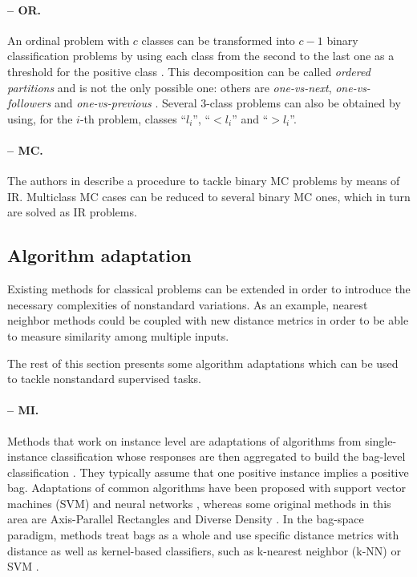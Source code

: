 \paragraph{-- OR.} An ordinal problem with $c$ classes can be transformed into $c-1$ binary classification problems by using each class from the second to the last one as a threshold for the positive class \cite{ord-simple}. This decomposition can be called \emph{ordered partitions} and is not the only possible one: others are \emph{one-vs-next}, \emph{one-vs-followers} and \emph{one-vs-previous} \cite{ord-survey}. Several 3-class problems can also be obtained by using, for the $i$-th problem, classes ``$l_i$'', ``$<l_i$'' and ``$>l_i$''.

\paragraph{-- MC.} The authors in \cite{monotonicity} describe a procedure to tackle binary MC problems by means of IR. Multiclass MC cases can be reduced to several binary MC ones, which in turn are solved as IR problems. 

\subsection{Algorithm adaptation}

Existing methods for classical problems can be extended in order to introduce the necessary complexities of nonstandard variations. As an example, nearest neighbor methods could be coupled with new distance metrics in order to be able to measure similarity among multiple inputs.

The rest of this section presents some algorithm adaptations which can be used to tackle nonstandard supervised tasks.


\paragraph{-- MI.} 
Methods that work on instance level are adaptations of algorithms from single-instance classification whose responses are then aggregated to build the bag-level classification \cite{mic-taxonomy}. They typically assume that one positive instance implies a positive bag. Adaptations of common algorithms have been proposed with support vector machines (SVM) \cite{mi-svm} and neural networks \cite{mi-nn}, whereas some original methods in this area are Axis-Parallel Rectangles \cite{mi-apr} and Diverse Density \cite{mi-framework}. In the bag-space paradigm, methods treat bags as a whole and use specific distance metrics with distance as well as kernel-based classifiers, such as k-nearest neighbor (k\nobreakdash-NN) \cite{mi-knn} or SVM \cite{mi-kernel}.

